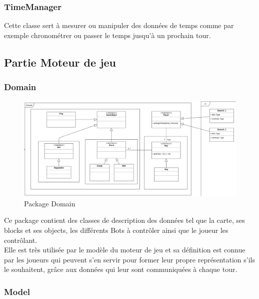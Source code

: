 \subsubsection{TimeManager}

Cette classe sert à mesurer ou manipuler des données de temps comme par exemple chronométrer ou passer le temps jusqu'à un prochain tour.

\subsection{Partie Moteur de jeu}

\subsubsection{Domain}

\begin{figure}[H]
    \centering
    \includegraphics[scale=0.35]{data/archi/domain.png}
    \caption{Package Domain}
\end{figure}

Ce package contient des classes de description des données tel que la carte, ses blocks et ses objects, les différents Bots à contrôler ainsi que le joueur les contrôlant.\\

Elle est très utilisée par le modèle du moteur de jeu et sa définition est connue par les joueurs qui peuvent s'en servir pour former leur propre représentation s'ils le souhaitent, grâce aux données qui leur sont communiquées à chaque tour.

\subsubsection{Model}

